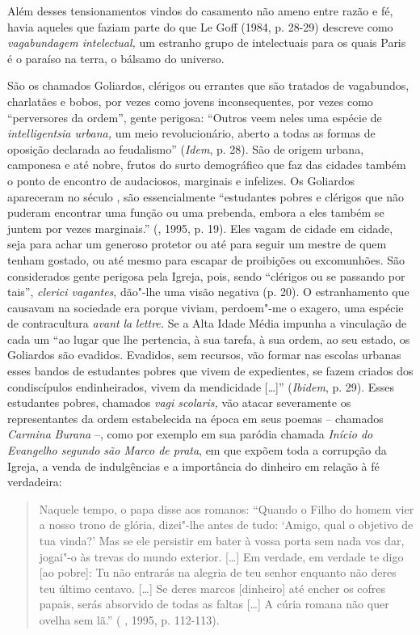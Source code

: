 Além desses tensionamentos vindos do casamento não ameno entre razão e
fé, havia aqueles que faziam parte do que Le Goff (1984, p. 28-29)
descreve como \emph{vagabundagem intelectual,} um estranho grupo de
intelectuais para os quais Paris é o paraíso na terra, o bálsamo do
universo.

São os chamados Goliardos, clérigos ou errantes que são tratados de
vagabundos, charlatães e bobos, por vezes como jovens inconsequentes,
por vezes como ``perversores da ordem'', gente perigosa: ``Outros veem
neles uma espécie de \emph{intelligentsia urbana,} um meio
revolucionário, aberto a todas as formas de oposição declarada ao
feudalismo'' (\emph{Idem}, p. 28). São de origem urbana, camponesa e até
nobre, frutos do surto demográfico que faz das cidades também o ponto de
encontro de audaciosos, marginais e infelizes. Os Goliardos apareceram
no século , são essencialmente ``estudantes pobres e clérigos que não
puderam encontrar uma função ou uma prebenda, embora a eles também se
juntem por vezes marginais.'' (, 1995, p. 19). Eles vagam de cidade
em cidade, seja para achar um generoso protetor ou até para seguir um
mestre de quem tenham gostado, ou até mesmo para escapar de proibições
ou excomunhões. São considerados gente perigosa pela Igreja, pois, sendo
``clérigos ou se passando por tais'', \emph{clerici vagantes}, dão"-lhe
uma visão negativa (p. 20). O estranhamento que causavam na
sociedade era porque viviam, perdoem"-me o exagero, uma espécie
de contracultura \emph{avant} \emph{la} \emph{lettre.} Se a Alta Idade
Média impunha a vinculação de cada um ``ao lugar que lhe pertencia, à
sua tarefa, à sua ordem, ao seu estado, os Goliardos são evadidos.
Evadidos, sem recursos, vão formar nas escolas urbanas esses bandos de
estudantes pobres que vivem de expedientes, se fazem criados dos
condiscípulos endinheirados, vivem da mendicidade [\ldots{}]''
(\emph{Ibidem}, p. 29). Esses estudantes pobres, chamados \emph{vagi
scolaris,} vão atacar severamente os representantes da ordem
estabelecida na época em seus poemas -- chamados \emph{Carmina}
\emph{Burana} --, como por exemplo em sua paródia chamada \emph{Início do
Evangelho segundo são Marco de prata}, em que expõem toda a corrupção da
Igreja, a venda de indulgências e a importância do dinheiro em relação à
fé verdadeira:

\begin{quote}
Naquele tempo, o papa disse aos romanos: ``Quando o Filho do homem vier
a nosso trono de glória, dizei"-lhe antes de tudo: `Amigo, qual o
objetivo de tua vinda?' Mas se ele persistir em bater à vossa porta sem
nada vos dar, jogai"-o às trevas do mundo exterior. [\ldots{}] Em
verdade, em verdade te digo [ao pobre]: Tu não entrarás na alegria
de teu senhor enquanto não deres teu último centavo. [\ldots{}] Se
deres marcos [dinheiro] até encher os cofres papais, serás absorvido
de todas as faltas [\ldots{}] A cúria romana não quer ovelha sem
lã.'' ( , 1995, p. 112-113).
\end{quote}

